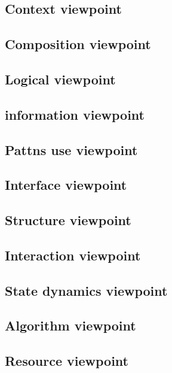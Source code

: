 \documentclass{scrreprt}
\begin{document}
\subsection{Context viewpoint}

\subsection{Composition viewpoint}

\subsection{Logical viewpoint}

\subsection{information viewpoint}

\subsection{Pattns use viewpoint}

\subsection{Interface viewpoint}

\subsection{Structure viewpoint}

\subsection{Interaction viewpoint}

\subsection{State dynamics viewpoint}

\subsection{Algorithm viewpoint}

\subsection{Resource viewpoint}
\end{document}
